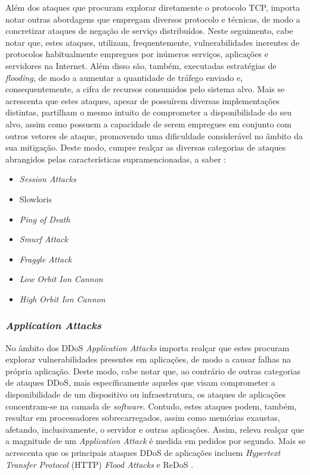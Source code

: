 Além dos ataques que procuram explorar diretamente o protocolo TCP, importa notar outras abordagens que empregam diversos protocolo e técnicas, de modo a concretizar ataques de negação de serviço distribuídos. Neste seguimento, cabe notar que, estes ataques, utilizam, frequentemente, vulnerabilidades inerentes de protocolos habitualmente empregues por inúmeros serviços, aplicações e servidores na Internet. Além disso são, também, executadas estratégias de \textit{flooding}, de modo a aumentar a quantidade de tráfego enviado e, consequentemente, a cifra de recursos consumidos pelo sistema alvo. Mais se acrescenta que estes ataques, apesar de possuírem diversas implementações distintas, partilham o mesmo intuito de comprometer a disponibilidade do seu alvo, assim como possuem a capacidade de serem empregues em conjunto com outros vetores de ataque, promovendo uma dificuldade considerável no âmbito da sua mitigação. Deste modo, cumpre realçar as diversas categorias de ataques abrangidos pelas características supramencionadas, a saber \cite{esecurityplanet_types_of_ddos_attacks,connectwise_types_of_ddos_attacks}:
\begin{itemize}
    \item \textit{Session Attacks}
    \item Slowloris
    \item \textit{Ping of Death}
    \item \textit{Smurf Attack}
    \item \textit{Fraggle Attack}
    \item \textit{Low Orbit Ion Cannon}
    \item \textit{High Orbit Ion Cannon}
\end{itemize}

\subsubsection{\textit{Application Attacks}}
No âmbito dos DDoS \textit{Application Attacks} importa realçar que estes procuram explorar vulnerabilidades presentes em aplicações, de modo a causar falhas na própria aplicação. Deste modo, cabe notar que, ao contrário de outras categorias de ataques DDoS, mais específicamente aqueles que visam comprometer a disponibilidade de um dispositivo ou infraestrutura, os ataques de aplicações concentram-se na camada de \textit{software}. Contudo, estes ataques podem, também, resultar em processadores sobrecarregados, assim como memórias exaustas, afetando, inclusivamente, o servidor e outras aplicações. Assim, releva realçar que a magnitude de um \textit{Application Attack} é medida em pedidos por segundo. Mais se acrescenta que os principais ataques DDoS de aplicações incluem \textit{Hypertext Transfer Protocol} (HTTP) \textit{Flood Attacks} e ReDoS \cite{esecurityplanet_types_of_ddos_attacks,connectwise_types_of_ddos_attacks}.

